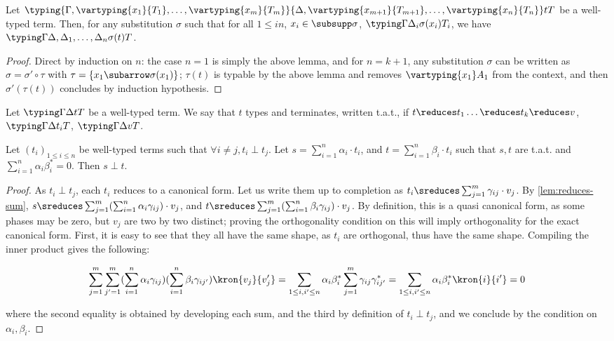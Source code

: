 \begin{corollary}\label{lem:substitutionlemma}
  Let $\typing {\Gamma, \vartyping{x_1}{T_1}, \dots,
  \vartyping{x_m}{T_m}}{\Delta, \vartyping{x_{m+1}}{T_{m+1}}, \dots,
  \vartyping{x_n}{T_n}} t T$ be a well-typed term.
  Then, for any substitution $\sigma$ such that for all $1 \leq i n$,
  $x_i \in \subsupp \sigma$, $\typing \Gamma {\Delta_i} {\sigma(x_i)}
  {T_i}$, we have $\typing \Gamma {\Delta, \Delta_1, \dots, \Delta_n}
  {\sigma(t)} T$.
\end{corollary}

\begin{proof}
  Direct by induction on $n$: the case $n = 1$ is simply the above
  lemma, and for $n=k+1$, any substitution $\sigma$ can be written as
  $\sigma= \sigma' \circ \tau$ with $\tau = \{x_1 \subarrow
  \sigma(x_1)\}$; $\tau(t)$ is typable by the above lemma and removes
  $\vartyping {x_1} A_1$ from the context, and then
  $\sigma'(\tau(t))$ concludes by induction hypothesis. \qedhere
\end{proof}

\begin{definition}
  Let $\typing \Gamma \Delta t T$ be a well-typed term.
  We say that $t$ types and terminates, written t.a.t.,
  if $t \reduces t_1 \dots \reduces t_k \reduces v$,
  $\typing \Gamma \Delta {t_i} T$,
  $\typing \Gamma \Delta v T$.
\end{definition}

\begin{lemma}\label{lem:ortho-sum}
  Let $(t_i)_{1 \leq i \leq n}$ be well-typed terms
  such that $\forall i \neq j, t_i \perp t_j$.
  Let $s = \sum_{i=1}^n \alpha_i \cdot t_i$,
  and $t = \sum_{i=1}^n \beta_i \cdot t_i$
  such that $s, t$ are t.a.t. and $\sum_{i=1}^n \alpha_i \beta_i^* = 0$.
  Then $s \perp t$.
\end{lemma}

\begin{proof}
  As $t_i \perp t_j$, each $t_i$ reduces to a canonical form.
  Let us write them up to completion as
  $t_i \sreduces \sum_{j=1}^m \gamma_{ij} \cdot v_j$.
  By \autoref{lem:reduces-sum},
  $s \sreduces \sum_{j=1}^m
  (\sum_{i=1}^n \alpha_i \gamma_{ij}) \cdot v_j$, and
  $t \sreduces \sum_{j=1}^m
  (\sum_{i=1}^n \beta_i \gamma_{ij}) \cdot v_j$.
  By definition, this is a quasi canonical form, as some phases may be zero, but
  $v_j$ are two by two distinct; proving the orthogonality condition
  on this will imply
  orthogonality for the exact canonical form.
  First, it is easy to see that they all have the same shape,
  as $t_i$ are orthogonal, thus have the same shape.
  Compiling the inner product gives the following:

  \[
    \sum_{j=1}^m \sum_{j'=1}^m (\sum_{i=1}^n \alpha_i
    \gamma_{ij})(\sum_{i=1}^n \beta_i \gamma_{ij'}) \kron{v_j}{v_j'}
    = \sum_{1 \leq i,i' \leq n} \alpha_i \beta_i^* \sum_{j=1}^m
    \gamma_{ij} \gamma_{ij'}^*
    = \sum_{1 \leq i,i' \leq n} \alpha_i \beta_i^*  \kron{i}{i'} = 0
  \]

  where the second equality is obtained by developing each sum, and the third
  by definition of $t_i \perp t_j$, and we conclude by the condition
  on $\alpha_i, \beta_i$. \qedhere
\end{proof}

